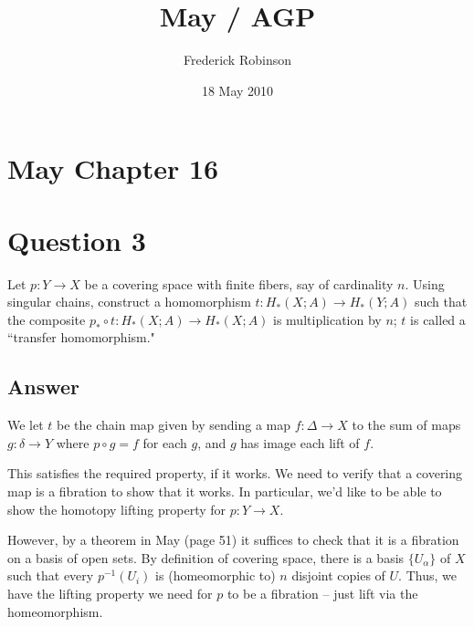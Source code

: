 \documentclass[11pt]{article}
\begin{document}



\title{May / AGP}
\author{Frederick Robinson}
\date{18 May 2010}
\maketitle


\section*{May Chapter 16}
\section{Question 3}
Let $p : Y \to X$ be a covering space with finite fibers, say of cardinality $n$. Using singular chains, construct a homomorphism $t : H_* (X; A) \to H_*(Y; A)$ such that the composite $p_* \circ t : H _* (X; A) \to H_* (X;A)$ is multiplication by $n$; $t$ is called a ``transfer homomorphism."
\subsection{Answer}
We let $t$ be the chain map given by sending a map $f: \Delta \to X$ to the sum of maps $g: \delta \to Y$ where $p \circ g = f$ for each $g$, and $g$ has image each lift of $f$.

This satisfies the required property, if it works. We need to verify that a covering map is a fibration to show that it works. In particular, we'd like to be able to show the homotopy lifting property for $p: Y\to X$.

However, by a theorem in May (page 51) it suffices to check that it is a fibration on a basis of open sets. By definition of covering space, there is a basis $\{U _ \alpha\}$ of  $X$ such that every $p^{-1}(U_i)$ is (homeomorphic to) $n$ disjoint copies of $U$. Thus, we have the lifting property we need for $p$ to be a fibration -- just lift via the homeomorphism. 


\end{document}
